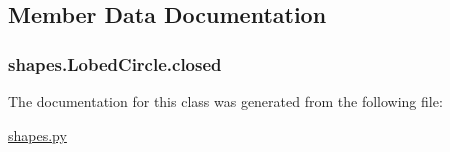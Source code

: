 \subsection{Member Data Documentation}
\hypertarget{classshapes_1_1_lobed_circle_a9ed93ca485834ea6a798040d2168728e}{}
\subsubsection[{closed}]{\setlength{\rightskip}{0pt plus 5cm}shapes.\+Lobed\+Circle.\+closed}\label{classshapes_1_1_lobed_circle_a9ed93ca485834ea6a798040d2168728e}


The documentation for this class was generated from the following file\+:\begin{DoxyCompactItemize}
\item 
\hyperlink{shapes_8py}{shapes.\+py}\end{DoxyCompactItemize}
